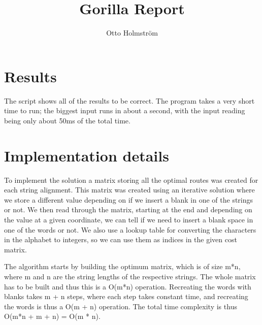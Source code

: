 \documentclass{article}
\title{Gorilla Report}
\author{Otto Holmström}
\begin{document}
  \maketitle

  \section{Results}

The script shows all of the results to be correct. The program takes a very short time to run; the biggest input runs in about a second, with the input reading being only about 50ms of the total time.

  \section{Implementation details}

To implement the solution a matrix storing all the optimal routes was created for each string alignment. This matrix was created using an iterative solution where we store a different value depending on if we insert a blank in one of the strings or not. We then read through the matrix, starting at the end and depending on the value at a given coordinate, we can tell if we need to insert a blank space in one of the words or not. We also use a lookup table for converting the characters in the alphabet to integers, so we can use them as indices in the given cost matrix.

The algorithm starts by building the optimum matrix, which is of size m*n, where m and n are the string lengths of the respective strings. The whole matrix has to be built and thus this is a O(m*n) operation. Recreating the words with blanks takes m + n steps, where each step takes constant time, and recreating the words is thus a O(m + n) operation. The total time complexity is thus O(m*n + m + n) = O(m * n).
\end{document}
